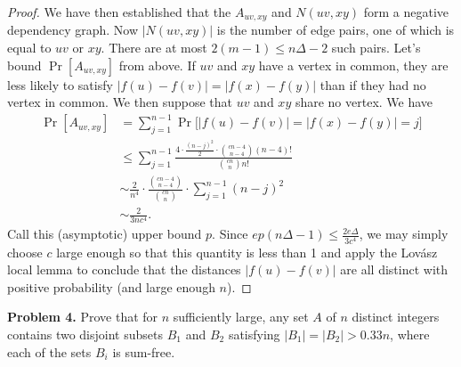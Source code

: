 \documentclass[11pt,letterpaper]{report}
\begin{document}
\begin{proof}
    We have then established that the $A_{uv,xy}$ and $N(uv, xy)$ form a negative dependency graph.
    Now $|N(uv, xy)|$ is the number of edge pairs, one of which is equal to $uv$ or $xy$.
    There are at most $2(m-1) \leq n\Delta-2$ such pairs.
    Let's bound $\Pr[A_{uv, xy}]$ from above.
    If $uv$ and $xy$ have a vertex in common, they are less likely to satisfy $|f(u)-f(v)| = |f(x)-f(y)|$ than if they had no vertex in common.
    We then suppose that $uv$ and $xy$ share no vertex.
    We have
    \begin{align*}
        \Pr[A_{uv, xy}] &= \sum_{j=1}^{n-1}\Pr\bigg[|f(u)-f(v)| = |f(x)-f(y)| = j\bigg]\\
        &\leq \sum_{j=1}^{n-1}\frac{4\cdot \frac{(n-j)^2}{2}\cdot \binom{cn-4}{n-4}(n-4)!}{\binom{cn}{n}n!}\\
        &\sim \frac{2}{n^4}\cdot \frac{\binom{cn-4}{n-4}}{\binom{cn}{n}}\cdot \sum_{j=1}^{n-1}(n-j)^2\\
        &\sim \frac{2}{3nc^4}.
    \end{align*}
    Call this (asymptotic) upper bound $p$.
    Since $ep(n\Delta - 1) \leq \frac{2e\Delta}{3c^4}$, we may simply choose $c$ large enough so that this quantity is less than 1 and apply the Lov\'asz local lemma to conclude that the distances $|f(u)-f(v)|$ are all distinct with positive probability (and large enough $n$).
\end{proof}










\noindent\textbf{Problem 4. }
Prove that for $n$ sufficiently large, any set $A$ of $n$ distinct integers contains two disjoint subsets $B_1$ and $B_2$ satisfying $|B_1| = |B_2| > 0.33n$, where each of the sets $B_i$ is sum-free.
\end{document}
